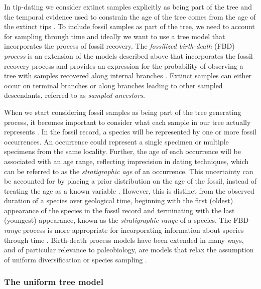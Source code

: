 In tip-dating we consider extinct samples explicitly as being part of the tree and the temporal evidence used to constrain the age of the tree comes from the age of the extinct tips \citep{Ronquist2012a}.
To include fossil samples as part of the tree, we need to account for sampling through time and ideally we want to use a tree model that incorporates the process of fossil recovery.
The \textit{fossilized birth-death} (FBD) \textit{process} is an extension of the models described above that incorporates the fossil recovery process and provides an expression for the probability of observing a tree with samples recovered along internal branches \citep{Stadler2010,Heath2014,Gavryushkina2014}.
Extinct samples can either occur on terminal branches or along branches leading to other sampled descendants, referred to as \textit{sampled ancestors}.

When we start considering fossil samples as being part of the tree generating process, it becomes important to consider what each sample in our tree actually represents \citep{Hopkins2018}. 
In the fossil record, a species will be represented by one or more fossil occurrences.
An occurrence could represent a single specimen or multiple specimens from the same locality.
Further, the age of each occurrence will be associated with an age range, reflecting imprecision in dating techniques, which can be referred to as the \textit{stratigraphic age} of an occurrence.
This uncertainty can be accounted for by placing a prior distribution on the age of the fossil, instead of treating the age as a known variable \citep{Drummond2016,BaridoSottani2019a}.
However, this is distinct from the observed duration of a species over geological time, beginning with the first (oldest) appearance of the species in the fossil record and terminating with the last (youngest) appearance, known as the \textit{stratigraphic range} of a species.
The FBD \textit{range} process is more appropriate for incorporating information about species through time \citep{Stadler2017}.
Birth-death process models have been extended in many ways, and of particular relevance to paleobiology,  are models that relax the assumption of uniform diversification or species sampling \citep{Hoehna2011,Stadler2013b,Gavryushkina2014,Zhang2016,Kuehnert2016,BaridoSottani2018}.

\subsubsection{The uniform tree model}

